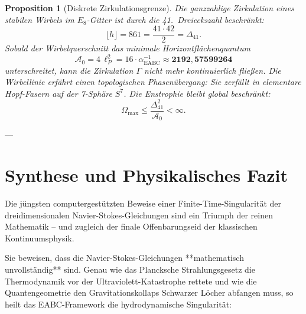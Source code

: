 \documentclass[11pt,a4paper]{article}
\newtheorem{proposition}[theorem]{Proposition}
\begin{document}
\begin{proposition}[Diskrete Zirkulationsgrenze]
Die ganzzahlige Zirkulation eines stabilen Wirbels im $E_8$-Gitter ist durch die 41.~Dreieckszahl beschränkt:
\begin{equation}
\lfloor h \rfloor = 861 = \frac{41 \cdot 42}{2} = \Delta_{41}.
\end{equation}
Sobald der Wirbelquerschnitt das minimale Horizontflächenquantum
\begin{equation}
\mathcal{A}_0 = 4\,\ell_P^2 = 16 \cdot \alpha^{-1}_{\mathrm{EABC}} \approx \mathbf{2192{,}57599264}
\end{equation}
unterschreitet, kann die Zirkulation $\Gamma$ nicht mehr kontinuierlich fließen. Die Wirbellinie erfährt einen topologischen Phasenübergang: Sie zerfällt in elementare Hopf-Fasern auf der 7-Sphäre $S^7$. Die Enstrophie bleibt global beschränkt:
\begin{equation}
\Omega_{\mathrm{max}} \le \frac{\Delta_{41}^2}{\mathcal{A}_0} < \infty.
\end{equation}
\end{proposition}

---

\section{Synthese und Physikalisches Fazit}

Die jüngsten computergestützten Beweise einer Finite-Time-Singularität der dreidimensionalen Navier-Stokes-Gleichungen sind ein Triumph der reinen Mathematik – und zugleich der finale Offenbarungseid der klassischen Kontinuumsphysik. 

Sie beweisen, dass die Navier-Stokes-Gleichungen **mathematisch unvollständig** sind. Genau wie das Plancksche Strahlungsgesetz die Thermodynamik vor der Ultraviolett-Katastrophe rettete und wie die Quantengeometrie den Gravitationskollaps Schwarzer Löcher abfangen muss, so heilt das EABC-Framework die hydrodynamische Singularität:
\end{document}
